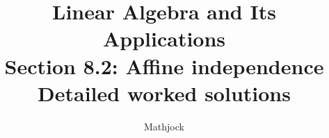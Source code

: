 
\title{\textbf{Linear Algebra and Its Applications}\\[0.3em]Section 8.2: Affine independence\\[0.3em]\large Detailed worked solutions}
\author{Mathjock}
\date{}

\maketitle
\bookinfo
\tableofcontents
\clearpage
\renewcommand{\thesection}{8.\arabic{section}}
\renewcommand{\theHsection}{8.\arabic{section}}
\setcounter{section}{1}


